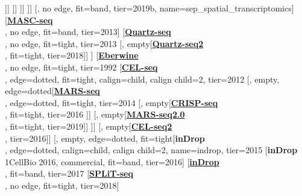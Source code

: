 \documentclass[12pt, a4]{article}
\begin{document}
\begin{center}
\begin{forest}
					[\href{https://science.sciencemag.org/content/363/6434/1463}{\textbf{Slide-seq\textsuperscript{\large{\textmu}}}}\\\citealt{rodriques2019}, no edge, fit=band, tier=2019]
				]]
			]]
		]]
	]]
	[, no edge, fit=band, tier=2019b, name=sep_spatial_transcriptomics]
	[\href{https://www.nature.com/articles/ncomms13182}{\textbf{MASC-seq}}\\\citealt{vickovic2016}, no edge, fit=band, tier=2013]
	[\href{https://genomebiology.biomedcentral.com/articles/10.1186/gb-2013-14-4-r31}{\textbf{Quartz-seq}}\\\citealt{sasagawa2013}, no edge, fit=tight, tier=2013
		[, empty[\href{https://genomebiology.biomedcentral.com/articles/10.1186/s13059-018-1407-3}{\textbf{Quartz-seq2}}\\\citealt{sasagawa2018}, fit=tight, tier=2018]]
	]
	[\href{https://www.pnas.org/content/89/7/3010}{\textbf{Eberwine}}\\\citealt{eberwine1992}, no edge, fit=tight, tier=1992
	[\href{https://www.cell.com/cell-reports/fulltext/S2211-1247(12)00228-8}{\textbf{CEL-seq}}\\\citealt{hashimshony2012}, edge=dotted, fit=tight, calign=child, calign child=2, tier=2012
		[, empty, edge=dotted[\href{https://science.sciencemag.org/content/343/6172/776}{\textbf{MARS-seq}}\\\citealt{jaitin2014}, edge=dotted, fit=tight, tier=2014
			[, empty[\href{https://linkinghub.elsevier.com/retrieve/pii/S0092-8674(16)31611-7}{\textbf{CRISP-seq}}\\\citealt{jaitin2016}, fit=tight, tier=2016
			]]
			[, empty[\href{https://www.nature.com/articles/s41596-019-0164-4}{\textbf{MARS-seq2.0}}\\\citealt{keren-shaul2019}, fit=tight, tier=2019]]
		]]
		[, empty[\href{https://genomebiology.biomedcentral.com/articles/10.1186/s13059-016-0938-8}{\textbf{CEL-seq2}}\\\citealt{hashimshony2016}, tier=2016]]
		[, empty, edge=dotted, fit=tight[\textbf{inDrop}\\\citealt{klein2015}, edge=dotted, calign=child, calign child=2, name=indrop, tier=2015
			[\textbf{inDrop}\\1CellBio 2016, commercial, fit=band,  tier=2016]
			[\href{https://www.nature.com/articles/nprot.2016.154}{\textbf{inDrop}}\\\citealt{zilionis2017}, fit=band, tier=2017
				[\href{https://science.sciencemag.org/content/360/6385/176}{\textbf{SPLiT-seq}}\\\citealt{rosenberg2018}, no edge, fit=tight, tier=2018]

\end{forest}
\end{center}
\end{document}
